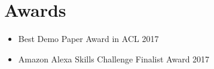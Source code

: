 \section{Awards}
\begin{itemize}
\setlength\itemsep{-5pt}
\item Best Demo Paper Award in ACL 2017
\item Amazon Alexa Skills Challenge Finalist Award 2017
\end{itemize}
